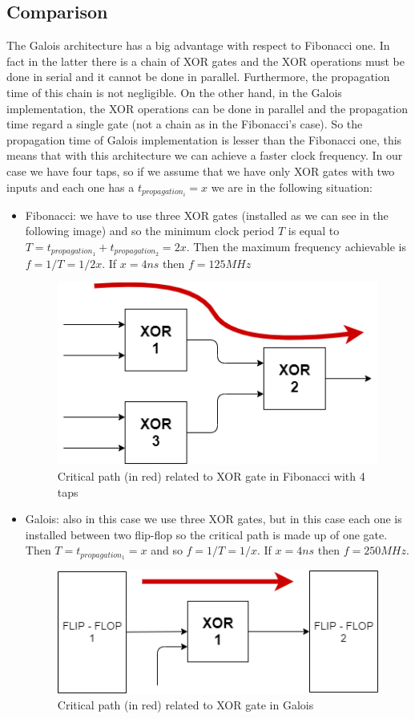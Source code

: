 \documentclass[a4paper]{report}
\begin{document}
\subsection{Comparison}
The Galois architecture has a big advantage with respect to Fibonacci one. In fact in the latter there is a chain of XOR gates and the XOR operations must be done in serial and it cannot be done in parallel. Furthermore, the propagation time of this chain is not negligible. On the other hand, in the Galois implementation, the XOR operations can be done in parallel and the propagation time regard a single gate (not a chain as in the Fibonacci's case). So the propagation time of Galois implementation is lesser than the Fibonacci one, this means that with this architecture we can achieve a faster clock frequency.
In our case we have four taps, so if we assume that we have only XOR gates with two inputs and each one has a $t_{propagation_{i}} = x$ we are in the following situation:
	\begin{itemize}
		\item Fibonacci: we have to use three XOR gates (installed as we can see in the following image) and so the minimum clock period $T$ is equal to $T = t_{propagation_{1}} + t_{propagation_{2}} = 2x$. Then the maximum frequency achievable is $f=1/T=1/2x$. If $x=4ns$ then $f = 125 MHz$
		\begin{figure}[htpb]
			\centering
			\includegraphics[scale=0.5]{img/XOR chain.png}
			\caption{Critical path (in red) related to XOR gate in Fibonacci with 4 taps}
		\end{figure}
		\item Galois: also in this case we use three XOR gates, but in this case each one is installed between two flip-flop so the critical path is made up of one gate. Then $T = t_{propagation_{1}} =x$ and so $f = 1/T = 1/x$. If $x=4ns$ then $f = 250 MHz$.
			\begin{figure}[htpb]
			\centering
			\includegraphics[scale=0.5]{img/XORtp.png}
			\caption{Critical path (in red) related to XOR gate in Galois}
		\end{figure}
	\end{itemize}
\end{document}

